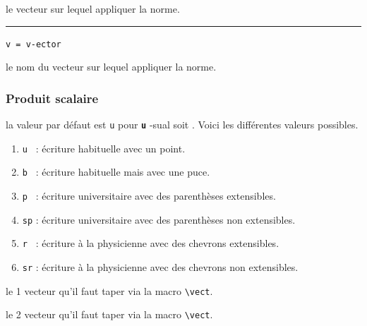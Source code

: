 \documentclass[12pt,a4paper]{book}
\makeatletter
\newcommand\env[1]{\texttt{#1}}
\newcommand\macro[1]{\env{\textbackslash{}#1}}
\theoremstyle{definition}
\newcommand\separation{
	\medskip
	\hfill\rule{0.5\textwidth}{0.75pt}\hfill
	\medskip
}
\newcommand\whyprefix[2]{%
	\textbf{\prefix{#1}}-#2%
}
\newcommand\mwhyprefix[2]{%
	\texttt{#1 = #1-#2}%
}
\newcommand\prefix[1]{%
	\texttt{#1}%
}
\newcommand\inenglish{\@ifstar{\@inenglish@star}{\@inenglish@no@star}}
\newcommand\@inenglish@star[1]{%
	\emph{\og #1 \fg}%
}
\newcommand\@inenglish@no@star[1]{%
	\@inenglish@star{#1} en anglais%
}
\makeatother
\begin{document}
{{\IDarg{} le vecteur sur lequel appliquer la norme.


\separation

 \hfill \mwhyprefix{v}{ector}

\IDarg{} le nom du vecteur sur lequel appliquer la norme.


\subsubsection{Produit scalaire}




\IDoption{} la valeur par défaut est \verb+u+ pour \whyprefix{u}{sual} soit \inenglish{habituel}.  Voici les différentes valeurs possibles.

\begin{enumerate}
	\item \verb+u + : écriture habituelle avec un point.

	\item \verb+b + : écriture habituelle mais avec une puce.

	\medskip
	
	\item \verb+p + : écriture \og universitaire \fg{} avec des parenthèses extensibles.

	\item \verb+sp+ : écriture \og universitaire \fg{} avec des parenthèses non extensibles.

	\medskip
	
	\item \verb+r + : écriture \og à la physicienne \fg{} avec des chevrons extensibles.

	\item \verb+sr+ : écriture \og à la physicienne \fg{} avec des chevrons non extensibles.

%
%
\end{enumerate}

 le 1\ier{} vecteur qu'il faut taper via la macro \macro{vect}.

 le 2\ieme{} vecteur qu'il faut taper via la macro \macro{vect}.


}}
\end{document}
